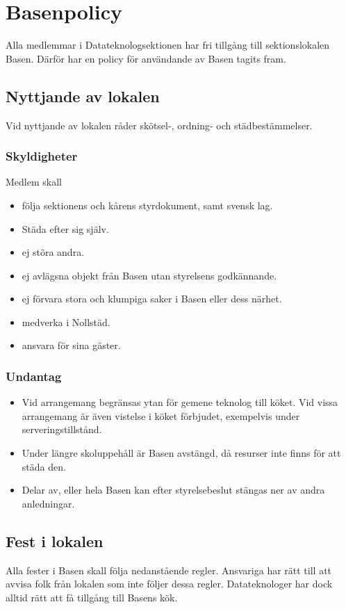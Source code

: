 \section{Basenpolicy}
Alla medlemmar i Datateknologsektionen har fri tillgång till sektionslokalen Basen. Därför har en policy för användande av Basen tagits fram.

\subsection{Nyttjande av lokalen}
Vid nyttjande av lokalen råder skötsel-, ordning- och städbestämmelser.

\subsubsection{Skyldigheter}
Medlem skall
\begin{itemize}
    \item följa sektionens och kårens styrdokument, samt svensk lag.
    \item Städa efter sig själv.
    \item ej störa andra.
    \item ej avlägsna objekt från Basen utan styrelsens godkännande.
    \item ej förvara stora och klumpiga saker i Basen eller dess närhet.
    \item medverka i Nollstäd.
    \item ansvara för sina gäster.
\end{itemize}

\subsubsection{Undantag}
\begin{itemize}
    \item Vid arrangemang begränsas ytan för gemene teknolog till köket. Vid vissa arrangemang är även vistelse i köket förbjudet, exempelvis under serveringstillstånd.
    \item Under längre skoluppehåll är Basen avstängd, då resurser inte finns för att städa den.
    \item Delar av, eller hela Basen kan efter styrelsebeslut stängas ner av andra anledningar.
\end{itemize}

\subsection{Fest i lokalen}
Alla fester i Basen skall följa nedanstående regler. Ansvariga har rätt till att avvisa folk från lokalen som inte följer dessa regler. Datateknologer har dock alltid rätt att få tillgång till Basens kök.
